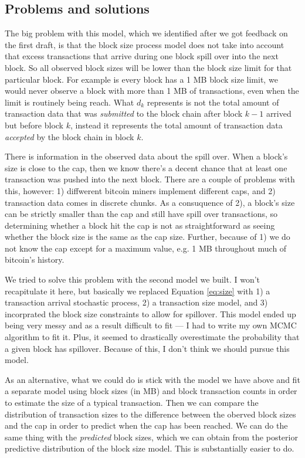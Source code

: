 \documentclass[12pt]{article}
\begin{document}
\subsection{Problems and solutions}
The big problem with this model, which we identified after we got feedback on the first draft, is that the block size process model does not take into account that excess transactions that arrive during one block spill over into the next block. So all observed block sizes will be lower than the block size limit for that particular block. For example is every block has a 1 MB block size limit, we would never observe a block with more than 1 MB of transactions, even when the limit is routinely being reach. What $d_k$ represents is not the total amount of transaction data that was {\it submitted} to the block chain after block $k-1$ arrived but before block $k$, instead it represents the total amount of transaction data {\it accepted} by the block chain in block $k$.

There is information in the observed data about the spill over. When a block's size is close to the cap, then we know there's a decent chance that at least one transaction was pushed into the next block. There are a couple of problems with this, however: 1) diffwerent bitcoin miners implement different caps, and 2) transaction data comes in discrete chunks. As a consuquence of 2), a block's size can be strictly smaller than the cap and still have spill over transactions, so determining whether a block hit the cap is not as straightforward as seeing whether the block size is the same as the cap size. Further, because of 1) we do not know the cap except for a maximum value, e.g. 1 MB throughout much of bitcoin's history.

We tried to solve this problem with the second model we built. I won't recapitulate it here, but basically we replaced Equation \eqref{eq:size} with 1) a transaction arrival stochastic process, 2) a transaction size model, and 3) incorprated the block size constraints to allow for spillover. This model ended up being very messy and as a result difficult to fit --- I had to write my own MCMC algorithm to fit it. Plus, it seemed to drastically overestimate the probability that a given block has spillover. Because of this, I don't think we should pursue this model.

As an alternative, what we could do is stick with the model we have above and fit a separate model using block sizes (in MB) and block transaction counts in order to estimate the size of a typical transaction. Then we can compare the distribution of transaction sizes to the difference between the oberved block sizes and the cap in order to predict when the cap has been reached. We can do the same thing with the {\it predicted} block sizes, which we can obtain from the posterior predictive distribution of the block size model. This is substantially easier to do.
\end{document}
